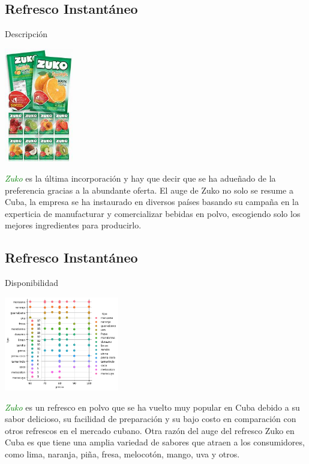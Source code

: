 \subsection{Refresco Instantáneo}
\begin{frame}[fragile]{Descripción}
  \begin{center}
    \includegraphics[width=3cm]{zuko.jpeg}
  \end{center}
  \textit{\Large\textcolor{green}{Zuko}} es la última incorporación y hay que decir que se ha adueñado de la preferencia gracias a la abundante oferta. 
  El auge de Zuko no solo se resume a Cuba, la empresa se ha instaurado en diversos países basando su campaña en la experticia de manufacturar y comercializar bebidas en polvo, escogiendo solo los mejores ingredientes para producirlo.
\end{frame}

\subsection{Refresco Instantáneo}
\begin{frame}[fragile]{Disponibilidad}
  \begin{center}
    \includegraphics[width=5cm]{zuko.png}
  \end{center}
  \textit{\Large\textcolor{green}{Zuko}} es un refresco en polvo que se ha vuelto muy popular en Cuba debido a su sabor delicioso, su facilidad de preparación y su bajo costo en comparación con otros refrescos en el mercado cubano. 
  Otra razón del auge del refresco Zuko en Cuba es que tiene una amplia variedad de sabores que atraen a los consumidores, como lima, naranja, piña, fresa, melocotón, mango, uva y otros.
\end{frame}

